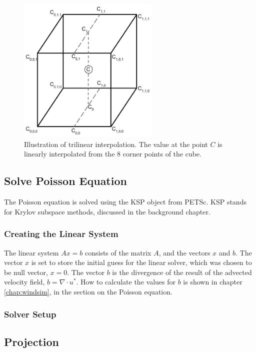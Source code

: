 \begin{figure}[ht]
	\center
	\includegraphics[width=0.6\textwidth]{images/trilinear_interpolation}
	\caption{Illustration of trilinear interpolation. The value at the point
	$C$ is linearly interpolated from the 8 corner points of the cube.}
	\label{fig:trilinearinterpolation}
\end{figure}

\subsection{Solve Poisson Equation}

The Poisson equation is solved using the KSP object from PETSc. KSP stands for
Krylov subspace methods, discussed in the background chapter.

\subsubsection{Creating the Linear System}

The linear system $Ax = b$ consists of the matrix $A$, and the vectors $x$ and
$b$. The vector $x$ is set to store the initial guess for the linear solver,
which was chosen to be null vector, $x = 0$. The vector $b$ is the divergence of
the result of the advected velocity field, $b = \nabla \cdot u^*$. How to
calculate the values for $b$ is shown in chapter \ref{chap:windsim}, in the
section on the Poisson equation. 

\subsubsection{Solver Setup}

\subsection{Projection}

